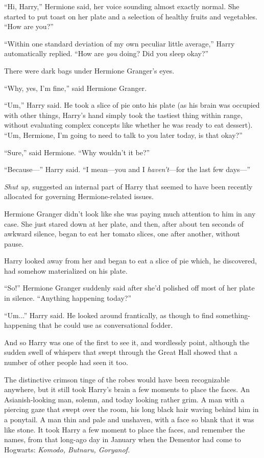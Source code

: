“Hi, Harry,” Hermione said, her voice sounding almost exactly
normal. She started to put toast on her plate and a selection of
healthy fruits and vegetables. “How are you?”

“Within one standard deviation of my own peculiar little
average,” Harry automatically replied. “How are \emph{you} doing?
Did you sleep okay?”

There were dark bags under Hermione Granger’s eyes.

“Why, yes, I’m fine,” said Hermione Granger.

“Um,” Harry said. He took a slice of pie onto his plate (as his
brain was occupied with other things, Harry’s hand simply took the
tastiest thing within range, without evaluating complex concepts
like whether he was ready to eat dessert). “Um, Hermione, I’m going
to need to talk to you later today, is that okay?”

“Sure,” said Hermione. “Why wouldn’t it be?”

“Because—” Harry said. “I mean—you and I \emph{haven’t}—for
the last few days—”

\emph{Shut up,} suggested an internal part of Harry that seemed
to have been recently allocated for governing Hermione-related
issues.

Hermione Granger didn’t look like she was paying much attention
to him in any case. She just stared down at her plate, and then,
after about ten seconds of awkward silence, began to eat her tomato
slices, one after another, without pause.

Harry looked away from her and began to eat a slice of pie
which, he discovered, had somehow materialized on his plate.

“So!” Hermione Granger suddenly said after she’d polished off
most of her plate in silence. “Anything happening today?”

“Um...” Harry said. He looked around frantically, as though to
find something-happening that he could use as conversational
fodder.

And so Harry was one of the first to see it, and wordlessly
point, although the sudden swell of whispers that swept through the
Great Hall showed that a number of other people had seen it
too.

The distinctive crimson tinge of the robes would have been
recognizable anywhere, but it still took Harry’s brain a few
moments to place the faces. An Asianish-looking man, solemn, and
today looking rather grim. A man with a piercing gaze that swept
over the room, his long black hair waving behind him in a ponytail.
A man thin and pale and unshaven, with a face so blank that it was
like stone. It took Harry a few moment to place the faces, and
remember the names, from that long-ago day in January when the
Dementor had come to Hogwarts: \emph{Komodo, Butnaru,
Goryanof.}

